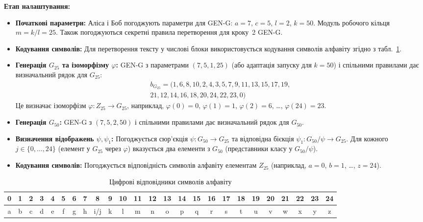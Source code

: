 \textbf{Етап налаштування:}
\begin{itemize}
    \item \textbf{Початкові параметри:} Аліса і Боб погоджують параметри для GEN-G: $a=7$, $c=5$, $l=2$, $k=50$.
    Модуль робочого кільця $m = k/l = 25$.
    Також погоджуються секретні правила перетворення для кроку~2 GEN-G.
    \item \textbf{Кодування символів:} Для перетворення тексту у числові блоки використовується кодування символів алфавіту згідно з табл.~\ref{tab:alphabet}.
    \item \textbf{Генерація $G_{25}$ та ізоморфізму $\varphi$:} GEN-G з параметрами $(7, 5, 1, 25)$ (або адаптація запуску для $k=50$) і спільними правилами дає визначальний рядок для $G_{25}$:
    \begin{equation*}
      \begin{multlined}
        b_{G_{25}} = (1, 6, 8, 10, 2, 4, 3, 5, 7, 9, 11, 13, 15, 17, 19, \\
                   21, 12, 14, 16, 18, 20, 24, 22, 23, 0)
      \end{multlined}
    \end{equation*}
    Це визначає ізоморфізм $\varphi: Z_{25} \to G_{25}$, наприклад, $\varphi(0)=0$, $\varphi(1)=1$, $\varphi(2)=6$, \ldots, $\varphi(24)=23$.
    \item \textbf{Генерація $G_{50}$:} GEN-G з $(7, 5, 2, 50)$ і спільними правилами дає визначальний рядок для $G_{50}$.
    \item \textbf{Визначення відображень $\psi, \psi_1$:} Погоджується сюр'єкція $\psi: G_{50} \to G_{25}$ та відповідна бієкція $\psi_1: G_{50}/\psi \to G_{25}$.
    Для кожного $j \in \{0, \ldots, 24\}$ (елемент у $G_{25}$ через $\varphi$) вказується два елементи з $G_{50}$ (представники класу у $G_{50}/\psi$).
    \item \textbf{Кодування символів:} Погоджується відповідність символів алфавіту елементам $Z_{25}$ (наприклад, $a=0$, $b=1$, \ldots, $z=24$).
\end{itemize}

\begin{table}[ht]
  \centering
  \small 
  \setlength{\tabcolsep}{3pt}
  \begin{tabular}{|*{25}{c|}}
  \hline 
  0 & 1 & 2 & 3 & 4 & 5 & 6 & 7 & 8 & 9 & 10 & 11 & 12 & 13 & 14  &
  15 & 16 & 17 & 18 & 19 & 20 & 21 & 22 & 23 &  24\\
  \hline
  a & b & c & d & e & f & g & h & i/j & k & l & m & n & o & p & q &
  r & s & t & u & v & w & x & y & z\\
  \hline
  \end{tabular}
  \caption{Цифрові відповідники символів алфавіту}
  \label{tab:alphabet}
\end{table}

